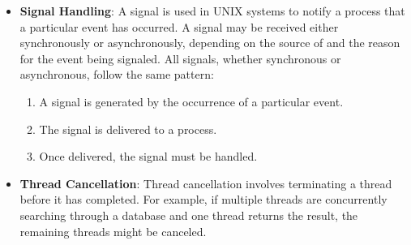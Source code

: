 \documentclass{report}
\begin{document}
\begin{itemize}
            \bigbreak \noindent 
            Thread pools offer these benefits:
            \begin{enumerate}
                \item Servicing a request with an existing thread is often faster than waiting to create a thread.
                \item A thread pool limits the number of threads that exist at any one point. This is particularly important on systems that cannot support a large number of concurrent threads.
                \item Separating the task to be performed from the mechanics of creating the task allows us to use different strategies for running the task. For example, the task could be scheduled to execute after a time delay or to execute periodically.
            \end{enumerate}
            \bigbreak \noindent 
            The number of threads in the pool can be set heuristically based on factors such as the number of CPUs in the system, the amount of physical memory, and the expected number of concurrent client requests. s. More sophisticated threadpool architectures can dynamically adjust the number of threads in the pool according to usage patterns. Such architectures provide the further benefit of having a smaller pool— thereby consuming less memory—when the load on the system is low
        \item \textbf{Signal Handling}: A signal is used in UNIX systems to notify a process that a particular event has occurred. A signal may be received either synchronously or asynchronously, depending on the source of and the reason for the event being signaled. All signals, whether synchronous or asynchronous, follow the same pattern:
            \begin{enumerate}
                \item A signal is generated by the occurrence of a particular event.
                \item The signal is delivered to a process.
                \item Once delivered, the signal must be handled.
            \end{enumerate}
        \item \textbf{Thread Cancellation}: Thread cancellation involves terminating a thread before it has completed. For example, if multiple threads are concurrently searching through a database and one thread returns the result, the remaining threads might be canceled.
            \bigbreak \noindent 

\end{itemize}
\end{document}
